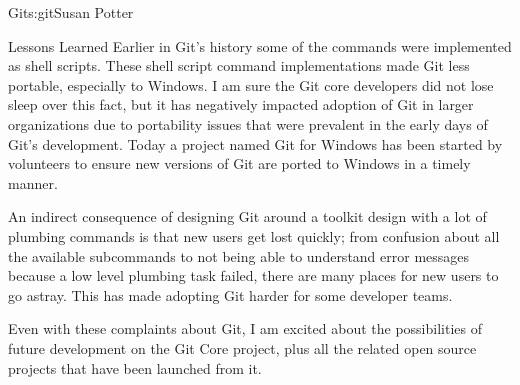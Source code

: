 \begin{aosachapter}{Git}{s:git}{Susan Potter}
\begin{aosasect1}{Lessons Learned}
Earlier in Git's history some of the commands were implemented as shell
scripts. These shell script command implementations made Git less portable,
especially to Windows. I am sure the Git core developers did not lose sleep
over this fact, but it has negatively impacted adoption of Git in larger organizations
due to portability issues that were prevalent in the early days
of Git's development. Today a project named Git for Windows has been
started by volunteers to ensure new versions of Git are ported to Windows in
a timely manner.

An indirect consequence of designing Git around a toolkit design
with a lot of plumbing commands is that new users get lost quickly; from
confusion about all the available subcommands to not being able to
understand error messages because a low level plumbing task failed, there
are many places for new users to go astray. This
has made adopting Git harder for some developer teams.

Even with these complaints about Git, I am excited about the possibilities
of future development on the Git Core project, plus all the related open
source projects that have been launched from it.

\end{aosasect1}

\end{aosachapter}
